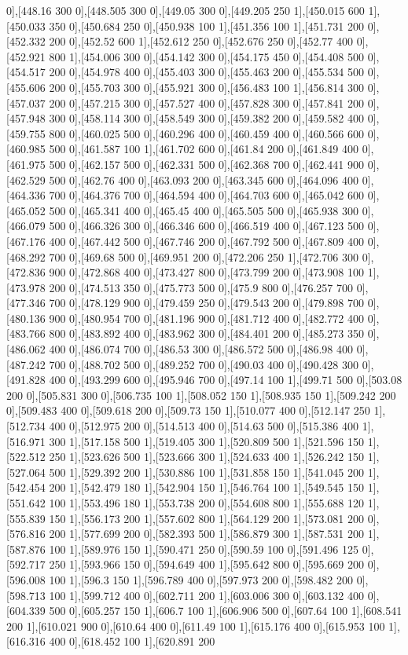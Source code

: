 {0],[448.16 300 0],[448.505 300 0],[449.05 300 0],[449.205 250 1],[450.015 600 1],[450.033 350 0],[450.684 250 0],[450.938 100 1],[451.356 100 1],[451.731 200 0],[452.332 200 0],[452.52 600 1],[452.612 250 0],[452.676 250 0],[452.77 400 0],[452.921 800 1],[454.006 300 0],[454.142 300 0],[454.175 450 0],[454.408 500 0],[454.517 200 0],[454.978 400 0],[455.403 300 0],[455.463 200 0],[455.534 500 0],[455.606 200 0],[455.703 300 0],[455.921 300 0],[456.483 100 1],[456.814 300 0],[457.037 200 0],[457.215 300 0],[457.527 400 0],[457.828 300 0],[457.841 200 0],[457.948 300 0],[458.114 300 0],[458.549 300 0],[459.382 200 0],[459.582 400 0],[459.755 800 0],[460.025 500 0],[460.296 400 0],[460.459 400 0],[460.566 600 0],[460.985 500 0],[461.587 100 1],[461.702 600 0],[461.84 200 0],[461.849 400 0],[461.975 500 0],[462.157 500 0],[462.331 500 0],[462.368 700 0],[462.441 900 0],[462.529 500 0],[462.76 400 0],[463.093 200 0],[463.345 600 0],[464.096 400 0],[464.336 700 0],[464.376 700 0],[464.594 400 0],[464.703 600 0],[465.042 600 0],[465.052 500 0],[465.341 400 0],[465.45 400 0],[465.505 500 0],[465.938 300 0],[466.079 500 0],[466.326 300 0],[466.346 600 0],[466.519 400 0],[467.123 500 0],[467.176 400 0],[467.442 500 0],[467.746 200 0],[467.792 500 0],[467.809 400 0],[468.292 700 0],[469.68 500 0],[469.951 200 0],[472.206 250 1],[472.706 300 0],[472.836 900 0],[472.868 400 0],[473.427 800 0],[473.799 200 0],[473.908 100 1],[473.978 200 0],[474.513 350 0],[475.773 500 0],[475.9 800 0],[476.257 700 0],[477.346 700 0],[478.129 900 0],[479.459 250 0],[479.543 200 0],[479.898 700 0],[480.136 900 0],[480.954 700 0],[481.196 900 0],[481.712 400 0],[482.772 400 0],[483.766 800 0],[483.892 400 0],[483.962 300 0],[484.401 200 0],[485.273 350 0],[486.062 400 0],[486.074 700 0],[486.53 300 0],[486.572 500 0],[486.98 400 0],[487.242 700 0],[488.702 500 0],[489.252 700 0],[490.03 400 0],[490.428 300 0],[491.828 400 0],[493.299 600 0],[495.946 700 0],[497.14 100 1],[499.71 500 0],[503.08 200 0],[505.831 300 0],[506.735 100 1],[508.052 150 1],[508.935 150 1],[509.242 200 0],[509.483 400 0],[509.618 200 0],[509.73 150 1],[510.077 400 0],[512.147 250 1],[512.734 400 0],[512.975 200 0],[514.513 400 0],[514.63 500 0],[515.386 400 1],[516.971 300 1],[517.158 500 1],[519.405 300 1],[520.809 500 1],[521.596 150 1],[522.512 250 1],[523.626 500 1],[523.666 300 1],[524.633 400 1],[526.242 150 1],[527.064 500 1],[529.392 200 1],[530.886 100 1],[531.858 150 1],[541.045 200 1],[542.454 200 1],[542.479 180 1],[542.904 150 1],[546.764 100 1],[549.545 150 1],[551.642 100 1],[553.496 180 1],[553.738 200 0],[554.608 800 1],[555.688 120 1],[555.839 150 1],[556.173 200 1],[557.602 800 1],[564.129 200 1],[573.081 200 0],[576.816 200 1],[577.699 200 0],[582.393 500 1],[586.879 300 1],[587.531 200 1],[587.876 100 1],[589.976 150 1],[590.471 250 0],[590.59 100 0],[591.496 125 0],[592.717 250 1],[593.966 150 0],[594.649 400 1],[595.642 800 0],[595.669 200 0],[596.008 100 1],[596.3 150 1],[596.789 400 0],[597.973 200 0],[598.482 200 0],[598.713 100 1],[599.712 400 0],[602.711 200 1],[603.006 300 0],[603.132 400 0],[604.339 500 0],[605.257 150 1],[606.7 100 1],[606.906 500 0],[607.64 100 1],[608.541 200 1],[610.021 900 0],[610.64 400 0],[611.49 100 1],[615.176 400 0],[615.953 100 1],[616.316 400 0],[618.452 100 1],[620.891 200 }
